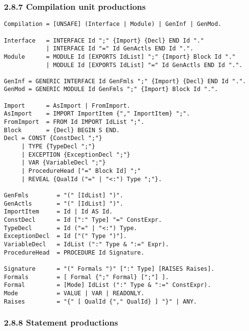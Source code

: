 \documentclass[10pt]{article}
\begin{document}
\subsubsection*{2.8.7 Compilation unit productions}

\begin{verbatim}
Compilation = [UNSAFE] (Interface | Module) | GenInf | GenMod.

Interface   = INTERFACE Id ";" {Import} {Decl} END Id "."
            | INTERFACE Id "=" Id GenActls END Id ".".
Module      = MODULE Id [EXPORTS IdList] ";" {Import} Block Id "."
            | MODULE Id [EXPORTS IdList] "=" Id GenActls END Id ".".

GenInf = GENERIC INTERFACE Id GenFmls ";" {Import} {Decl} END Id ".".
GenMod = GENERIC MODULE Id GenFmls ";" {Import} Block Id ".".

Import      = AsImport | FromImport.
AsImport    = IMPORT ImportItem {"," ImportItem} ";".
FromImport  = FROM Id IMPORT IdList ";".
Block       = {Decl} BEGIN S END.
Decl = CONST {ConstDecl ";"}
     | TYPE {TypeDecl ";"}
     | EXCEPTION {ExceptionDecl ";"}
     | VAR {VariableDecl ";"}
     | ProcedureHead ["=" Block Id] ";"
     | REVEAL {QualId ("=" | "<:") Type ";"}.

GenFmls        = "(" [IdList] ")".
GenActls       = "(" [IdList] ")".
ImportItem     = Id | Id AS Id.
ConstDecl      = Id [":" Type] "=" ConstExpr.
TypeDecl       = Id ("=" | "<:") Type.
ExceptionDecl  = Id ["(" Type ")"].
VariableDecl   = IdList (":" Type & ":=" Expr).
ProcedureHead  = PROCEDURE Id Signature.

Signature      = "(" Formals ")" [":" Type] [RAISES Raises].
Formals        = [ Formal {";" Formal} [";"] ].
Formal         = [Mode] IdList (":" Type & ":=" ConstExpr).
Mode           = VALUE | VAR | READONLY.
Raises         = "{" [ QualId {"," QualId} ] "}" | ANY.
\end{verbatim}

\subsubsection*{2.8.8 Statement productions}
\end{document}

